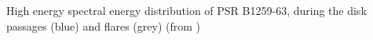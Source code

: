 High energy spectral energy distribution of PSR B1259-63, during the disk passages (blue) and flares (grey) (from \citet{2015MNRAS.454.1358C}) \label{fig:SED_PSR}